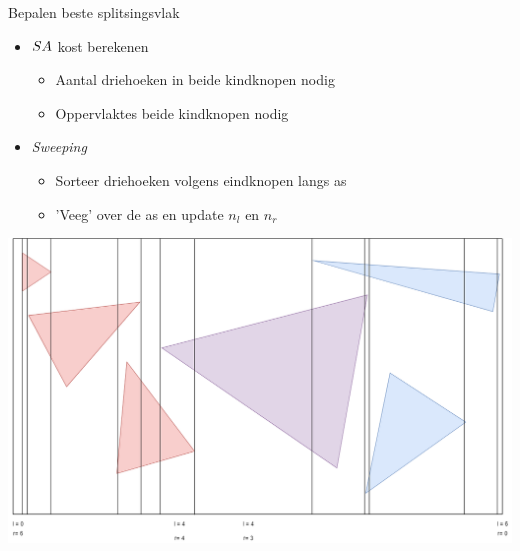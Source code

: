 \documentclass[11pt,t]{beamer}
\begin{document}
\begin{frame}{Bepalen beste splitsingsvlak}
	\begin{itemize}
		\item $SA$ kost berekenen
			\begin{itemize}
				\item Aantal driehoeken in beide kindknopen nodig
				\item Oppervlaktes beide kindknopen nodig
			\end{itemize}
		\item \textit{Sweeping}
			\begin{itemize}
				\item Sorteer driehoeken volgens eindknopen langs as
				\item 'Veeg' over de as en update $n_l$ en $n_r$
			\end{itemize}
	\end{itemize}
	\vspace{5pt}
	\hspace{10pt}
	\includegraphics[height=0.45\paperheight]{../img/sweep}
\end{frame}
\end{document}
